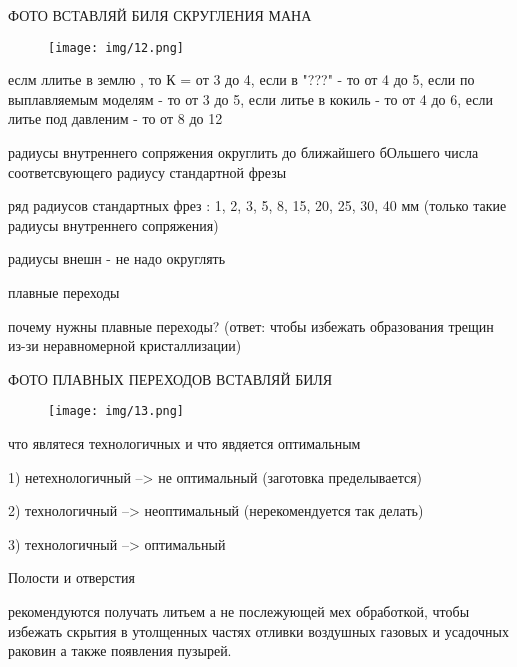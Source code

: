 {\begin{center}
    \par ФОТО ВСТАВЛЯЙ БИЛЯ СКРУГЛЕНИЯ МАНА
    \begin{figure}[H]
    \centering\texttt{[image: img/12.png]} 
    \end{figure}

    \par еслм ллитье в землю , то К = от 3 до 4,  если в "???" - то от 4 до 5, если по выплавляемым моделям - то от 3 до 5, если литье в кокиль - то от 4 до 6, если литье под давленим - то от 8 до 12

    \par радиусы внутреннего сопряжения округлить до ближайшего бОльшего числа соответсвующего радиусу стандартной фрезы

    \par ряд радиусов стандартных фрез : 1, 2, 3, 5, 8, 15, 20, 25, 30, 40 мм  (только такие радиусы внутреннего сопряжения) 

    \par радиусы внешн - не надо округлять

    \par плавные переходы

    \par почему нужны плавные переходы? (ответ: чтобы избежать образования трещин из-зи неравномерной кристаллизации)

    \par ФОТО ПЛАВНЫХ ПЕРЕХОДОВ ВСТАВЛЯЙ БИЛЯ
    \begin{figure}[H]
    \centering\texttt{[image: img/13.png]} 
    \end{figure}

    \par что являтеся технологичных и что явдяется оптимальным 

    \par 1) нетехнологичный --> не оптимальный (заготовка пределывается)

    \par 2) технологичный --> неоптимальный (нерекомендуется так делать)

    \par 3) технологичный --> оптимальный

    \par Полости и отверстия

    \par рекомендуются получать литьем а не послежующей мех обработкой, чтобы избежать скрытия в утолщенных частях отливки воздушных газовых и усадочных раковин а также появления пузырей.


\end{center}}

